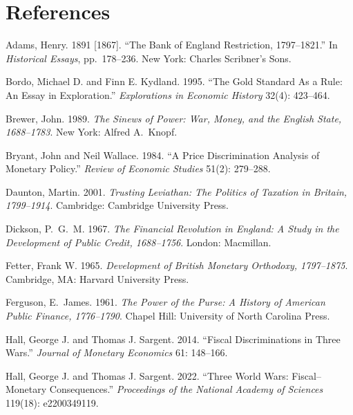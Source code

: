 \documentclass[12pt]{article}
\begin{document}
\section*{References}

\begin{description}
\setlength\itemsep{0.5em}

\item Adams, Henry. 1891 [1867]. ``The Bank of England Restriction,
1797--1821.'' In \textit{Historical Essays}, pp.~178--236. New York:
Charles Scribner's Sons.

\item Bordo, Michael D. and Finn E. Kydland. 1995. ``The Gold Standard
As a Rule: An Essay in Exploration.'' \textit{Explorations in Economic
History} 32(4): 423--464.

\item Brewer, John. 1989. \textit{The Sinews of Power: War, Money,
and the English State, 1688--1783}. New York: Alfred A.~Knopf.

\item Bryant, John and Neil Wallace. 1984. ``A Price Discrimination
Analysis of Monetary Policy.'' \textit{Review of Economic Studies}
51(2): 279--288.

\item Daunton, Martin. 2001. \textit{Trusting Leviathan: The Politics
of Taxation in Britain, 1799--1914}. Cambridge: Cambridge University
Press.

\item Dickson, P.~G.~M. 1967. \textit{The Financial Revolution in England:
A Study in the Development of Public Credit, 1688--1756}. London:
Macmillan.

\item Fetter, Frank W. 1965. \textit{Development of British Monetary
Orthodoxy, 1797--1875}. Cambridge, MA: Harvard University Press.

\item Ferguson, E.~James. 1961. \textit{The Power of the Purse: A
History of American Public Finance, 1776--1790}. Chapel Hill:
University of North Carolina Press.

\item Hall, George J. and Thomas J. Sargent. 2014. ``Fiscal
Discriminations in Three Wars.'' \textit{Journal of Monetary Economics}
61: 148--166.

\item Hall, George J. and Thomas J. Sargent. 2022. ``Three World Wars:
Fiscal--Monetary Consequences.'' \textit{Proceedings of the National
Academy of Sciences} 119(18): e2200349119.


\end{description}
\end{document}
